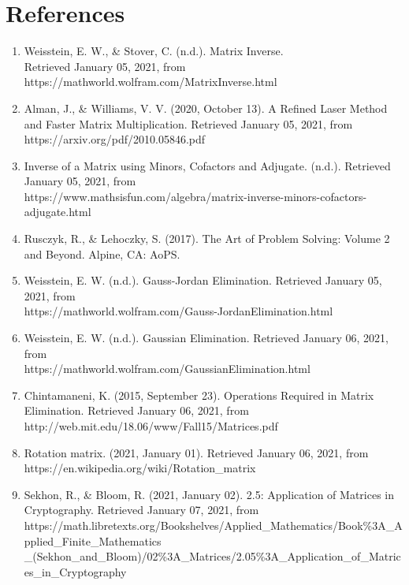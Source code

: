 \documentclass{article}
\begin{document}
\section*{References}
\begin{enumerate}[leftmargin=!,labelindent=5pt,itemindent=-15pt]
    \item Weisstein, E. W., \& Stover, C. (n.d.). Matrix Inverse. \\ Retrieved January 05, 2021, from https://mathworld.wolfram.com/MatrixInverse.html
    \item Alman, J., \& Williams, V. V. (2020, October 13). A Refined Laser Method and Faster Matrix Multiplication. Retrieved January 05, 2021, from https://arxiv.org/pdf/2010.05846.pdf
    \item Inverse of a Matrix using Minors, Cofactors and Adjugate. (n.d.). Retrieved January 05, 2021, from \\ https://www.mathsisfun.com/algebra/matrix-inverse-minors-cofactors-adjugate.html
    \item Rusczyk, R., \& Lehoczky, S. (2017). The Art of Problem Solving: Volume 2 and Beyond. Alpine, CA: AoPS.
    \item Weisstein, E. W. (n.d.). Gauss-Jordan Elimination. Retrieved January 05, 2021, from \\ https://mathworld.wolfram.com/Gauss-JordanElimination.html
    \item Weisstein, E. W. (n.d.). Gaussian Elimination. Retrieved January 06, 2021, from \\ https://mathworld.wolfram.com/GaussianElimination.html
    \item Chintamaneni, K. (2015, September 23). Operations Required in Matrix Elimination. Retrieved January 06, 2021, from http://web.mit.edu/18.06/www/Fall15/Matrices.pdf
    \item Rotation matrix. (2021, January 01). Retrieved January 06, 2021, from https://en.wikipedia.org/wiki/Rotation\_matrix
    \item Sekhon, R., \& Bloom, R. (2021, January 02). 2.5: Application of Matrices in Cryptography. Retrieved January 07, 2021, from\\ https://math.libretexts.org/Bookshelves/Applied\_Mathematics/Book\%3A\_Applied\_Finite\_Mathematics\\\_(Sekhon\_and\_Bloom)/02\%3A\_Matrices/2.05\%3A\_Application\_of\_Matrices\_in\_Cryptography
\end{enumerate}
\end{document}
